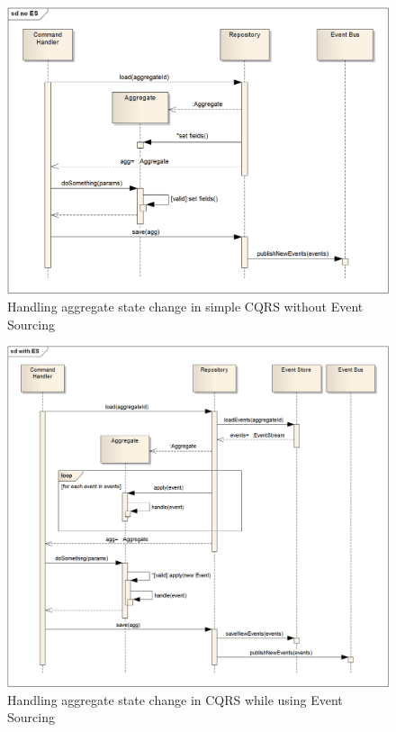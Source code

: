 \documentclass{book}
\begin{document}
\begin{figure}[h!]
\begin{center}
\includegraphics[width=0.98\columnwidth]{figures/cqrs-no-es/cqrs-no-es}
\caption{Handling aggregate state change in simple CQRS without Event Sourcing%
}
\end{center}
\end{figure}

\begin{figure}[h!]
\begin{center}
\includegraphics[width=0.98\columnwidth]{figures/cqrs-es/cqrs-es}
\caption{Handling aggregate state change in CQRS while using Event Sourcing%
}
\end{center}
\end{figure}
\end{document}
